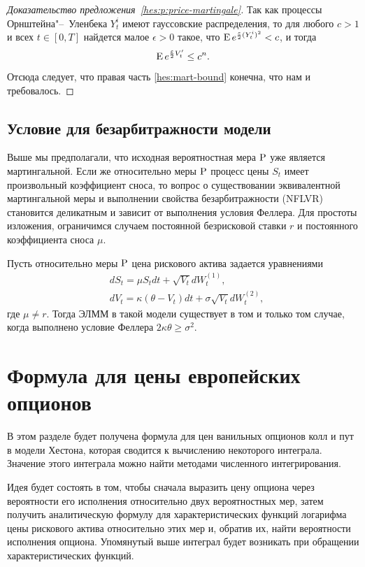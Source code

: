 \begin{proof}[Доказательство предложения~\ref{hes:p:price-martingale}]
Так как процессы Орнштейна"--~Уленбека $Y_t^i$ имеют гауссовские распределения, то для любого $c>1$ и всех $t\in[0,T]$ найдется малое $\epsilon>0$ такое, что $\E e^{\frac\epsilon2 (Y_t^i)^2} < c$, и тогда
\[
\E e^{\frac\epsilon2 V_t'} \le c^n.
\]
Отсюда следует, что правая часть \eqref{hes:mart-bound} конечна, что нам и требовалось.
\end{proof}


\subsection{Условие для безарбитражности модели \difficult}

Выше мы предполагали, что исходная вероятностная мера $\P$ уже является мартингальной.
Если же относительно меры $\P$ процесс цены $S_t$ имеет произвольный коэффициент сноса, то вопрос о существовании эквивалентной мартингальной меры и выполнении свойства безарбитражности (NFLVR) становится деликатным и зависит от выполнения условия Феллера.
Для простоты изложения, ограничимся случаем постоянной безрисковой ставки $r$ и постоянного коэффициента сноса $\mu$.

\begin{proposition}
Пусть относительно меры $\P$ цена рискового актива задается уравнениями
\begin{align*}
&d S_t = \mu S_t dt + \sqrt{V_t} d W_t^{(1)},\\
&d V_t = \kappa(\theta-V_t)dt + \sigma \sqrt{V_t} d W_t^{(2)},
\end{align*}
где $\mu\neq r$.
Тогда ЭЛММ в такой модели существует в том и только том случае, когда выполнено условие Феллера $2\kappa\theta\ge \sigma^2$.
\end{proposition}


\section{Формула для цены европейских опционов}

В этом разделе будет получена формула для цен ванильных опционов колл и пут в модели Хестона, которая сводится к вычислению некоторого интеграла.
Значение этого интеграла можно найти методами численного интегрирования.

Идея будет состоять в том, чтобы сначала выразить цену опциона через вероятности его исполнения относительно двух вероятностных мер, затем получить аналитическую формулу для характеристических функций логарифма цены рискового актива относительно этих мер и, обратив их, найти вероятности исполнения опциона.
Упомянутый выше интеграл будет возникать при обращении характеристических функций.

